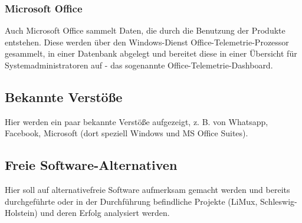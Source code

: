 \subsubsection{Microsoft Office}
Auch Microsoft Office sammelt Daten, die durch die Benutzung der Produkte entstehen. Diese werden über den Windows-Dienst \glqq Office-Telemetrie-Prozessor\grqq{} gesammelt, in einer Datenbank abgelegt und bereitet diese in einer Übersicht für Systemadministratoren auf - das sogenannte \glqq Office-Telemetrie-Dashboard\grqq{}. 


\subsection{Bekannte Verstöße}
Hier werden ein paar bekannte Verstöße aufgezeigt, z. B. von Whatsapp, Facebook, Microsoft (dort speziell Windows und MS Office Suites).

\subsection{Freie Software-Alternativen}
Hier soll auf alternativefreie Software aufmerksam gemacht werden und bereits durchgeführte oder in der Durchführung befindliche Projekte (LiMux, Schleswig-Holstein) und deren Erfolg analysiert werden.